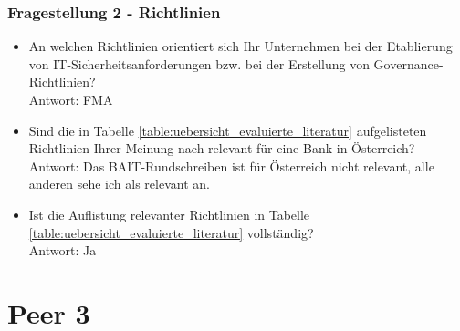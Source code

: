 \subsubsection{Fragestellung 2 - Richtlinien}
\begin{itemize}
    \item An welchen Richtlinien orientiert sich Ihr Unternehmen bei der Etablierung von IT-Sicherheitsanforderungen bzw. bei der Erstellung von Governance-Richtlinien?\\
    Antwort: FMA\\
    \item Sind die in Tabelle \ref{table:uebersicht_evaluierte_literatur} aufgelisteten Richtlinien Ihrer Meinung nach relevant für eine Bank in Österreich?\\
    Antwort: Das BAIT-Rundschreiben ist für Österreich nicht relevant, alle anderen sehe ich als relevant an. \\
    \item Ist die Auflistung relevanter Richtlinien in Tabelle \ref{table:uebersicht_evaluierte_literatur} vollständig?\\
    Antwort: Ja\\
\end{itemize}
\bigbreak

\section{Peer 3}
